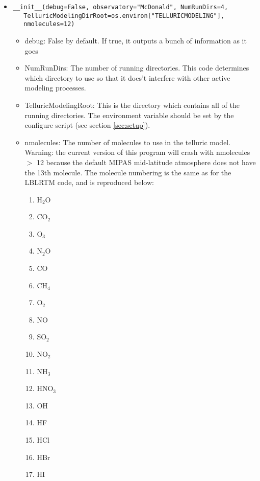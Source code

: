 \documentclass{article}
\begin{document}
\begin{itemize}
\item \begin{Verbatim}[commandchars=\\\{\}]
__init__(debug=False, observatory="McDonald", NumRunDirs=4,
   TelluricModelingDirRoot=os.environ["TELLURICMODELING"], 
   nmolecules=12)
\end{Verbatim}
  \begin{itemize}
  \item debug: False by default. If true, it outputs a bunch of information as it goes
  \item NumRunDirs: The number of running directories. This code determines which directory to use so that it does't interfere with other active modeling processes.
  \item TelluricModelingRoot: This is the directory which contains all of the running directories. The environment variable should be set by the configure script (see section \ref{sec:setup}).
  \item nmolecules: The number of molecules to use in the telluric model. Warning: the current version of this program will crash with nmolecules $>$ 12 because the default MIPAS mid-latitude atmosphere does not have the 13th molecule. The molecule numbering is the same as for the LBLRTM code, and is reproduced below:
  \begin{enumerate}
                \item   H$_2$O
                \item   CO$_2$
                \item   O$_3$
                \item   N$_2$O
                \item   CO
                \item   CH$_4$
                \item   O$_2$
                \item   NO
                \item   SO$_2$
                \item   NO$_2$
                \item   NH$_3$
                \item   HNO$_3$
                \item   OH
                \item   HF
                \item   HCl
                \item   HBr
                \item   HI

\end{enumerate}
\end{itemize}
\end{itemize}
\end{document}
